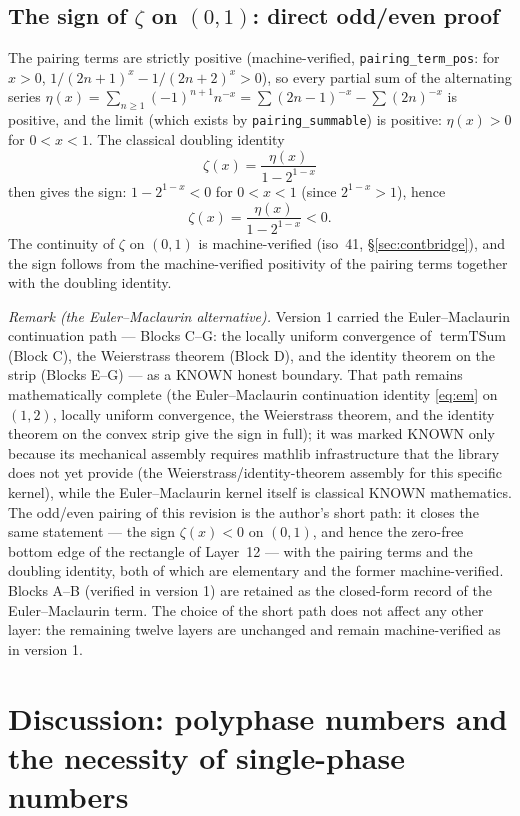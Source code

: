 \documentclass{article}
\newcommand{\zt}{\zeta}
\begin{document}
\subsection{The sign of $\zt$ on $(0,1)$: direct odd/even proof}
\label{sec:blocksCG}

The pairing terms are strictly positive (machine-verified,
\texttt{pairing\_term\_pos}: for $x>0$,
$1/(2n+1)^x-1/(2n+2)^x>0$), so every partial sum of the alternating series
$\eta(x)=\sum_{n\ge1}(-1)^{n+1}n^{-x}=\sum(2n-1)^{-x}-\sum(2n)^{-x}$ is
positive, and the limit (which exists by \texttt{pairing\_summable}) is
positive: $\eta(x)>0$ for $0<x<1$. The classical doubling identity
\[
\zt(x)=\frac{\eta(x)}{1-2^{1-x}}
\]
then gives the sign: $1-2^{1-x}<0$ for $0<x<1$ (since $2^{1-x}>1$), hence
\[
\zt(x)=\frac{\eta(x)}{1-2^{1-x}}<0.
\]
The continuity of $\zt$ on $(0,1)$ is machine-verified (iso~41,
\S\ref{sec:contbridge}), and the sign follows from the machine-verified
positivity of the pairing terms together with the doubling identity.

\emph{Remark (the Euler--Maclaurin alternative).} Version 1 carried the
Euler--Maclaurin continuation path --- Blocks C--G: the locally uniform
convergence of $\operatorname{termTSum}$ (Block C), the Weierstrass theorem
(Block D), and the identity theorem on the strip (Blocks E--G) --- as a
KNOWN honest boundary. That path remains mathematically complete (the
Euler--Maclaurin continuation identity \eqref{eq:em} on $(1,2)$, locally
uniform convergence, the Weierstrass theorem, and the identity theorem on
the convex strip give the sign in full); it was marked KNOWN only because
its mechanical assembly requires mathlib infrastructure that the library
does not yet provide (the Weierstrass/identity-theorem assembly for this
specific kernel), while the Euler--Maclaurin kernel itself is classical
KNOWN mathematics. The odd/even pairing of this revision is the author's
short path: it closes the same statement --- the sign $\zt(x)<0$ on
$(0,1)$, and hence the zero-free bottom edge of the rectangle of
Layer~12 --- with the pairing terms and the doubling identity, both of
which are elementary and the former machine-verified. Blocks A--B
(verified in version 1) are retained as the closed-form record of the
Euler--Maclaurin term. The choice of the short path does not affect any
other layer: the remaining twelve layers are unchanged and remain
machine-verified as in version 1.

\section{Discussion: polyphase numbers and the necessity of single-phase numbers}
\label{sec:discussion}
\end{document}
